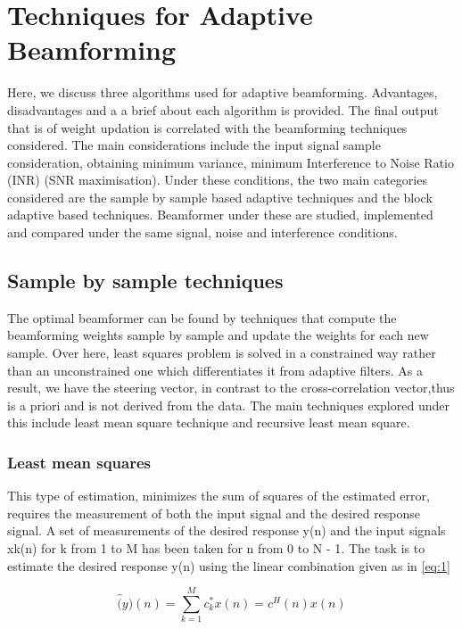 \chapter{Techniques for Adaptive Beamforming}

\indent\indent Here, we discuss three algorithms used for adaptive beamforming. Advantages, disadvantages and a a brief about each algorithm is provided. The final output that is of weight updation is correlated with the beamforming techniques considered. The main considerations include the input signal sample consideration, obtaining minimum variance, minimum Interference to Noise Ratio (INR) (SNR maximisation). Under these conditions, the two main categories considered are the sample by sample based adaptive
techniques and the block adaptive based techniques. Beamformer under these are studied,
implemented and compared under the same signal, noise and interference conditions.

\section{Sample by sample techniques}

The optimal beamformer can be found by techniques that compute the beamforming weights sample by sample and update the weights for each new sample. Over here, least squares problem is solved in a constrained way rather than an unconstrained one which differentiates it from adaptive filters. As a result, we have the steering vector, in contrast to the cross-correlation vector,thus is a priori and is not derived from the data. The main techniques explored under this include least mean square technique and recursive least mean square.

\subsection{Least mean squares}
This type of estimation, minimizes the sum of squares of the estimated error, requires the measurement of both the input signal and the desired response signal. A set of measurements of the desired response y(n) and the input signals xk(n) for k from 1 to M has been taken for n from 0 to N - 1. The task is to estimate the desired response y(n) using the linear combination given as in \ref{eq:1}

\begin{equation} \label{eq:1}
\hat(y)(n) = \sum_{k=1}^{M} c_{k}^{*}x(n) = c^{H}(n)x(n)
\end{equation}

